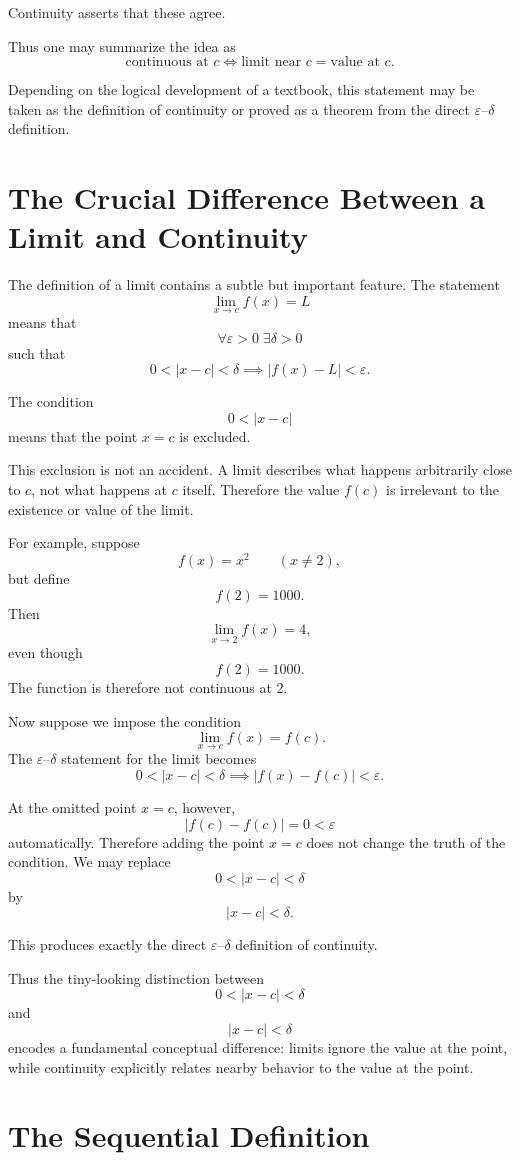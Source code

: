 \documentclass{essay}
\begin{document}
Continuity asserts that these agree.

Thus one may summarize the idea as
\[
\boxed{
\text{continuous at }c
\iff
\text{limit near }c = \text{value at }c.
}
\]

Depending on the logical development of a textbook, this statement may be taken as the definition of continuity or proved as a theorem from the direct $\varepsilon$--$\delta$ definition.

\section{The Crucial Difference Between a Limit and Continuity}

The definition of a limit contains a subtle but important feature. The statement
\[
\lim_{x\to c} f(x)=L
\]
means that
\[
\forall \varepsilon>0\;\exists\delta>0
\]
such that
\[
0<|x-c|<\delta
\implies
|f(x)-L|<\varepsilon.
\]

The condition
\[
0<|x-c|
\]
means that the point $x=c$ is excluded.

This exclusion is not an accident. A limit describes what happens arbitrarily close to $c$, not what happens at $c$ itself. Therefore the value $f(c)$ is irrelevant to the existence or value of the limit.

For example, suppose
\[
f(x)=x^2 \qquad (x\neq 2),
\]
but define
\[
f(2)=1000.
\]
Then
\[
\lim_{x\to 2} f(x)=4,
\]
even though
\[
f(2)=1000.
\]
The function is therefore not continuous at $2$.

Now suppose we impose the condition
\[
\lim_{x\to c}f(x)=f(c).
\]
The $\varepsilon$--$\delta$ statement for the limit becomes
\[
0<|x-c|<\delta
\implies
|f(x)-f(c)|<\varepsilon.
\]

At the omitted point $x=c$, however,
\[
|f(c)-f(c)|=0<\varepsilon
\]
automatically. Therefore adding the point $x=c$ does not change the truth of the condition. We may replace
\[
0<|x-c|<\delta
\]
by
\[
|x-c|<\delta.
\]

This produces exactly the direct $\varepsilon$--$\delta$ definition of continuity.

Thus the tiny-looking distinction between
\[
0<|x-c|<\delta
\]
and
\[
|x-c|<\delta
\]
encodes a fundamental conceptual difference: limits ignore the value at the point, while continuity explicitly relates nearby behavior to the value at the point.

\section{The Sequential Definition}
\end{document}
